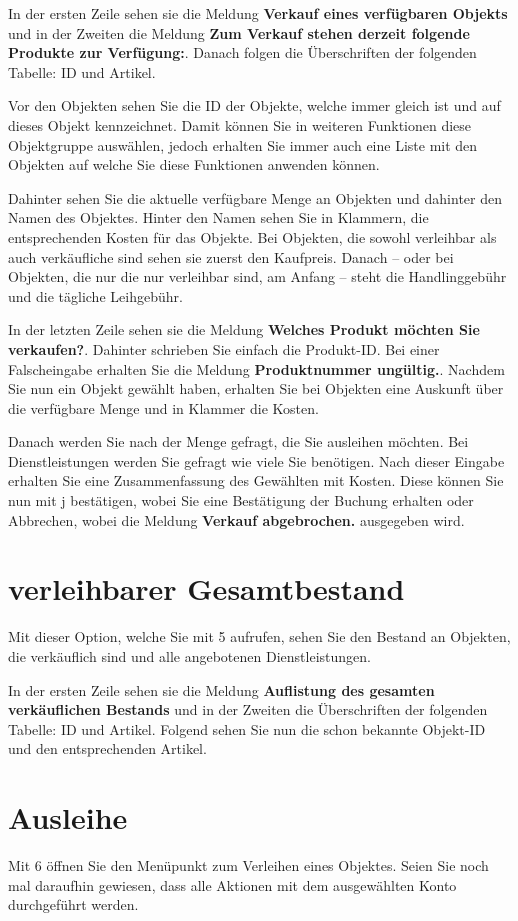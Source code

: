 ﻿\documentclass[a4paper,12pt,titlepage]{article}
\newcommand\enquote[1]{{\ttfamily \bfseries #1}}
\begin{document}
In der ersten Zeile sehen sie die Meldung \enquote{Verkauf eines verfügbaren Objekts}
 und in der Zweiten die Meldung \enquote{Zum Verkauf stehen derzeit folgende Produkte zur Verfügung:}.
Danach folgen die Überschriften der folgenden Tabelle: ID und Artikel.

Vor den Objekten sehen Sie die ID der Objekte, welche immer gleich ist und auf dieses Objekt kennzeichnet.
Damit können Sie in weiteren Funktionen diese Objektgruppe auswählen,
 jedoch erhalten Sie immer auch eine Liste mit den Objekten auf welche Sie diese Funktionen anwenden können.

Dahinter sehen Sie die aktuelle verfügbare Menge an Objekten und dahinter den Namen des Objektes.
Hinter den Namen sehen Sie in Klammern, die entsprechenden Kosten für das Objekte.
Bei Objekten, die sowohl verleihbar als auch verkäufliche sind sehen sie zuerst den Kaufpreis.
Danach -- oder bei Objekten, die nur die nur verleihbar sind, am Anfang --
steht die Handlinggebühr und die tägliche Leihgebühr.

In der letzten Zeile sehen sie die Meldung \enquote{Welches Produkt möchten Sie verkaufen?}.
Dahinter schrieben Sie einfach die Produkt-ID. Bei einer Falscheingabe erhalten Sie die Meldung \enquote{Produktnummer ungültig.}.
Nachdem Sie nun ein Objekt gewählt haben,
 erhalten Sie bei Objekten eine Auskunft über die verfügbare Menge und in Klammer die Kosten.

Danach werden Sie nach der Menge gefragt, die Sie ausleihen möchten.
Bei Dienstleistungen werden Sie gefragt wie viele Sie benötigen.
Nach dieser Eingabe erhalten Sie eine Zusammenfassung des Gewählten mit Kosten. 
Diese können Sie nun mit j bestätigen, wobei Sie eine Bestätigung der Buchung erhalten oder Abbrechen,
 wobei die Meldung \enquote{Verkauf abgebrochen.} ausgegeben wird.

\section{verleihbarer Gesamtbestand}
Mit dieser Option, welche Sie mit 5 aufrufen, sehen Sie den Bestand an Objekten,
 die verkäuflich sind und alle angebotenen Dienstleistungen.

In der ersten Zeile sehen sie die Meldung \enquote{Auflistung des gesamten verkäuflichen Bestands}
 und in der Zweiten die Überschriften der folgenden Tabelle: ID und Artikel.
Folgend sehen Sie nun die schon bekannte Objekt-ID und den entsprechenden Artikel.

\section{Ausleihe}
Mit 6 öffnen Sie den Menüpunkt zum Verleihen eines Objektes.
Seien Sie noch mal daraufhin gewiesen, dass alle Aktionen mit dem ausgewählten Konto durchgeführt werden.
\end{document}
